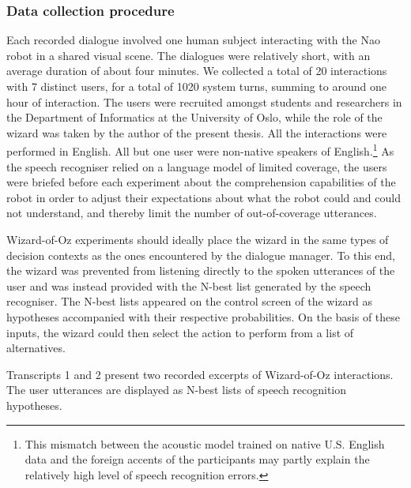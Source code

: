 \subsubsection*{Data collection procedure}
 Each recorded dialogue involved one human subject interacting with the Nao robot in a shared visual scene.  The dialogues were relatively short, with an average duration of about four minutes. We collected a total of 20 interactions with 7 distinct users, for a total of 1020 system turns, summing to around one hour of interaction.  The users were recruited amongst students and researchers in the Department of Informatics at the University of Oslo, while the role of the wizard was taken by the author of the present thesis.  All the interactions were performed in English. All but one user were non-native speakers of English.\footnote{This mismatch between the acoustic model trained on native U.S. English data and the foreign accents of the participants may partly explain the relatively high level of speech recognition errors.}  As the speech recogniser relied on a language model of limited coverage, the users were briefed before each experiment about the comprehension capabilities of the robot in order to adjust their expectations about what the robot could and could not understand, and thereby limit the number of out-of-coverage utterances.

Wizard-of-Oz experiments should ideally place the wizard in the same types of decision contexts as the ones encountered by the dialogue manager. To this end, the wizard was prevented from listening directly to the spoken utterances of the user and was instead provided with the N-best list generated by the speech recogniser.  The N-best lists appeared on the control screen of the wizard as hypotheses accompanied with their respective probabilities. On the basis of these inputs, the wizard could then select the action to perform from a list of alternatives.  

Transcripts 1 and 2 present two recorded excerpts of Wizard-of-Oz interactions.  The user utterances are displayed as N-best lists of speech recognition hypotheses. 

